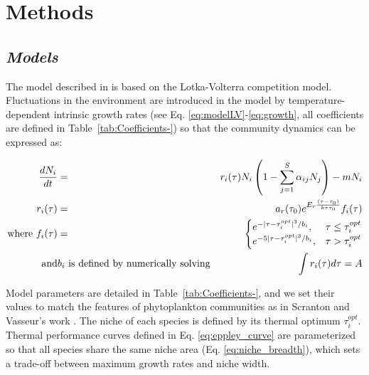 \documentclass[a4paper,12pt]{article}
\begin{document}
\section{Methods}

\subsection*{\emph{Models}}

The model described in \citet{scranton_coexistence_2016} is based
on the Lotka-Volterra competition model. Fluctuations in the environment
are introduced in the model by temperature-dependent intrinsic growth
rates (see Eq. \ref{eq:modelLV}-\ref{eq:growth}, all coefficients
are defined in Table~\ref{tab:Coefficients-}) so that the community
dynamics can be expressed as:

\begin{eqnarray}
\frac{dN_{i}}{dt} & = & r_{i}(\tau)N_{i}\left(1-\sum_{j=1}^{S}\alpha_{ij}N_{j}\right)-mN_{i}\label{eq:modelLV}\\
r_{i}(\tau) & = & a_{r}(\tau_{0})e^{E_{r}\frac{(\tau-\tau_{\text{0}})}{k\tau\tau_{0}}}f_{i}(\tau)\label{eq:growth}\\
\textnormal{where }f_{i}(\tau) & = & \begin{cases}
e^{-|\tau-\tau_{i}^{opt}|^{3}/b_{i}}, & \tau\leq\tau_{i}^{opt}\\
e^{-5|\tau-\tau_{i}^{opt}|^{3}/b_{i}}, & \tau>\tau_{i}^{opt}
\end{cases}\label{eq:eppley_curve}\\
\textnormal{and} & b_{i}\text{ is defined by numerically solving} & \int r_{i}(\tau)d\tau=A\label{eq:niche_breadth}
\end{eqnarray}

Model parameters are detailed in Table~\ref{tab:Coefficients-}, and
we set their values to match the features of phytoplankton communities
as in Scranton and Vasseur's work \citeyearpar{scranton_coexistence_2016}.
The niche of each species is defined by its thermal optimum $\tau_{i}^{opt}$.
Thermal performance curves defined in Eq. \ref{eq:eppley_curve} are
parameterized so that all species share the same niche area (Eq. \ref{eq:niche_breadth}),
which sets a trade-off between maximum growth rates and niche width.
\end{document}

